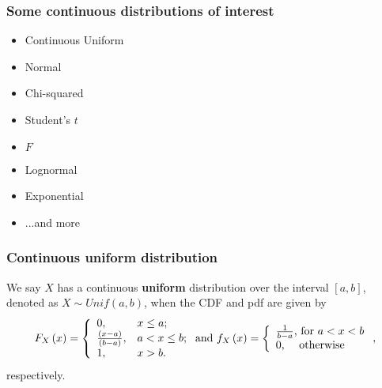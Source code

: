 \documentclass[notes=show,smaller,handout]{beamer}\usepackage[]{graphicx}\usepackage[]{color}
\newenvironment{stepitemize}{\begin{itemize}[<+->]}{\end{itemize} }
\begin{document}
\begin{frame}%

\frametitle{Some continuous distributions of interest}

\begin{stepitemize}
\item Continuous Uniform

\item Normal

\item Chi-squared

\item Student's $t$

\item $F$

\item Lognormal

\item Exponential

\item ...and more
\end{stepitemize}

\end{frame}%



\begin{frame}%

\frametitle{Continuous uniform distribution}

\begin{definition}
We say $X$ has a continuous \textbf{uniform} distribution over the
interval $[a,b]$, denoted as $X\sim Unif(a,b)$, when the CDF and pdf are given by
$$
{F_X\left( x\right)}=\left\{
                           \begin{array}{ll}
                             0, & \hbox{$x\leq a$;} \\
                             \frac{(x-a)}{(b-a)}, & \hbox{$a<x\leq b$;} \\
                             1, & \hbox{$x>b$.}
                           \end{array}
                         \right.\mbox{\color{black}and}~{f_{X}\left( x\right)} =\left\{
\begin{array}{l}
\frac{1}{b-a}\text{, for }a<x<b \\
0\text{, \quad otherwise}%
\end{array}%
\right. ,
$$
respectively.
\end{definition}
\end{frame}%
\end{document}
